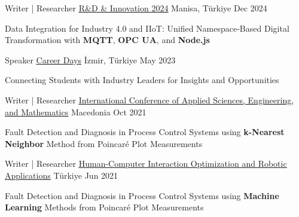 

\begin{cventries}

  \cventry
    {Writer | Researcher} %
{\underline{\href{https://drive.google.com/file/d/1ivfaVjw6XqgFRJAQo3pBvQmMTUhmbsgr/view?usp=sharing}{R\&D \& Innovation 2024}}} %
    {Manisa, Türkiye} %
    {Dec 2024} %
    {
      \begin{cvitems} %
        \item {Data Integration for Industry 4.0 and IIoT: Unified Namespace-Based Digital Transformation with \textbf{MQTT}, \textbf{OPC UA}, and \textbf{Node.js}}
      \end{cvitems}
    }

  \cventry
    {Speaker} %
{\underline{\href{https://drive.google.com/file/d/1ZALfm7lulleyhJFwW07I3UpTTDJ8onWq/view?usp=sharing}{Career Days}}} %
    {İzmir, Türkiye} %
    {May 2023} %
    {
      \begin{cvitems} %
        \item {Connecting Students with Industry Leaders for Insights and Opportunities}
      \end{cvitems}
    }

  \cventry
    {Writer | Researcher} %
{\underline{\href{https://drive.google.com/file/d/1ZPOH-EiYq5hWN7-3n2Lljo759LFpQRs1/view?usp=sharing}{International Conference of Applied Sciences, Engineering, and Mathematics}}} %
    {Macedonia} %
    {Oct 2021} %
    {
      \begin{cvitems} %
        \item {Fault Detection and Diagnosis in Process Control Systems using \textbf{k-Nearest Neighbor} Method from Poincaré Plot Measurements }
      \end{cvitems}
    }

  \cventry
    {Writer | Researcher} %
{\underline{\href{https://drive.google.com/file/d/1Z7KmRMDIiHNtQE6XNgA1lG3MkYo-7Zpp/view?usp=sharing}{Human-Computer Interaction Optimization and Robotic Applications}}} %
    {Türkiye} %
    {Jun 2021} %
    {
      \begin{cvitems} %
        \item {Fault Detection and Diagnosis in Process Control Systems using \textbf{Machine Learning} Methods from Poincaré Plot Measurements }
      \end{cvitems}
    }


\end{cventries}
